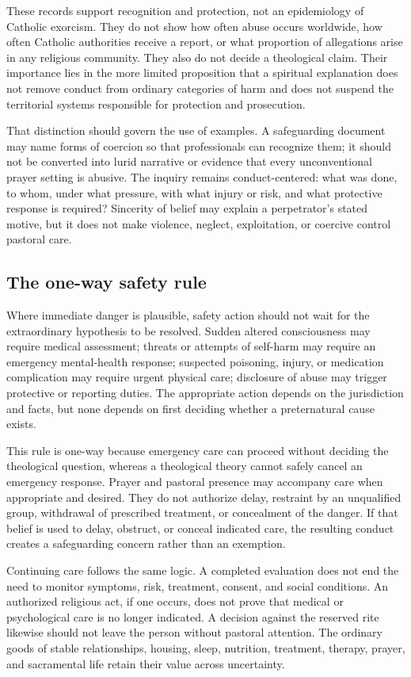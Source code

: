 These records support recognition and protection, not an epidemiology of
Catholic exorcism. They do not show how often abuse occurs worldwide, how often
Catholic authorities receive a report, or what proportion of allegations arise
in any religious community. They also do not decide a theological claim. Their
importance lies in the more limited proposition that a spiritual explanation
does not remove conduct from ordinary categories of harm and does not suspend
the territorial systems responsible for protection and prosecution.

That distinction should govern the use of examples. A safeguarding document
may name forms of coercion so that professionals can recognize them; it should
not be converted into lurid narrative or evidence that every unconventional
prayer setting is abusive. The inquiry remains conduct-centered: what was done,
to whom, under what pressure, with what injury or risk, and what protective
response is required? Sincerity of belief may explain a perpetrator's stated
motive, but it does not make violence, neglect, exploitation, or coercive
control pastoral care.

\subsection{The one-way safety rule}

Where immediate danger is plausible, safety action should not wait for the
extraordinary hypothesis to be resolved. Sudden altered consciousness may
require medical assessment; threats or attempts of self-harm may require an
emergency mental-health response; suspected poisoning, injury, or medication
complication may require urgent physical care; disclosure of abuse may trigger
protective or reporting duties. The appropriate action depends on the
jurisdiction and facts, but none depends on first deciding whether a
preternatural cause exists.

This rule is one-way because emergency care can proceed without deciding the
theological question, whereas a theological theory cannot safely cancel an
emergency response. Prayer and pastoral presence may accompany care when
appropriate and desired. They do not authorize delay, restraint by an
unqualified group, withdrawal of prescribed treatment, or concealment of the
danger. If that belief is used to delay, obstruct, or conceal indicated care,
the resulting conduct creates a safeguarding concern rather than an exemption.

Continuing care follows the same logic. A completed evaluation does not end
the need to monitor symptoms, risk, treatment, consent, and social conditions.
An authorized religious act, if one occurs, does not prove that medical or
psychological care is no longer indicated. A decision against the reserved
rite likewise should not leave the person without pastoral attention. The
ordinary goods of stable relationships, housing, sleep, nutrition, treatment,
therapy, prayer, and sacramental life retain their value across uncertainty.

